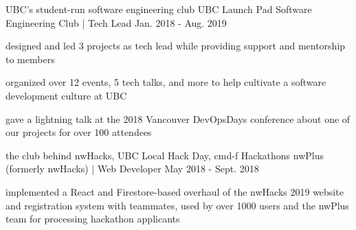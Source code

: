 \begin{cventries}

  \cventry
    {UBC's student-run software engineering club} %
    {UBC Launch Pad Software Engineering Club | Tech Lead} %
    {} %
    {Jan. 2018 - Aug. 2019} %
    {
      \begin{cvitems} %
        \item {designed and led 3 projects as tech lead while providing support and mentorship to members}
        \item {organized over 12 events, 5 tech talks, and more to help cultivate a software development culture at UBC}
        \item {gave a lightning talk at the 2018 Vancouver DevOpsDays conference about one of our projects for over 100 attendees}
      \end{cvitems}
    }

  \cventry
    {the club behind nwHacks, UBC Local Hack Day, cmd-f Hackathons} %
    {nwPlus (formerly nwHacks) | Web Developer} %
    {} %
    {May 2018 - Sept. 2018} %
    {
      \begin{cvitems} %
        \item {implemented a React and Firestore-based overhaul of the nwHacks 2019 website and registration system with teammates, used by over 1000 users and the nwPlus team for processing hackathon applicants}
      \end{cvitems}
    }

\end{cventries}
